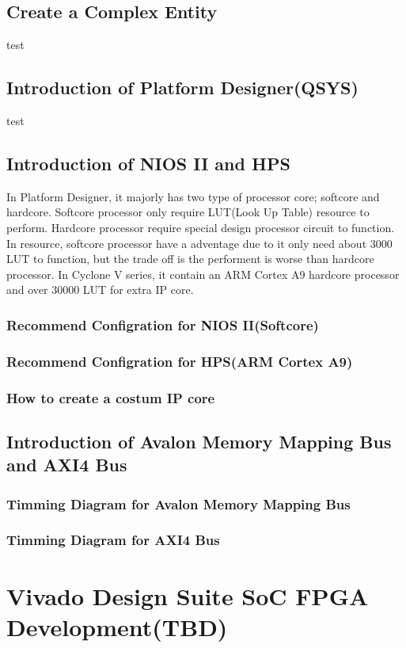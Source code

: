 \documentclass[12pt,article]{memoir}
\begin{document}
\section{Create a Complex Entity}
test
\section{Introduction of Platform Designer(QSYS)}
test
\section{Introduction of NIOS II and HPS}
In Platform Designer, it majorly has two type of processor core; softcore and hardcore. Softcore processor only require LUT(Look Up Table) resource to perform. Hardcore processor require special design processor circuit to function. In resource, softcore processor have a adventage due to it only need about 3000 LUT to function, but the trade off is the performent is worse than hardcore processor. In Cyclone V series, it contain an ARM Cortex A9 hardcore processor and over 30000 LUT for extra IP core.
\subsection{Recommend Configration for NIOS II(Softcore)}
\subsection{Recommend Configration for HPS(ARM Cortex A9)}
\subsection{How to create a costum IP core}
\section{Introduction of Avalon Memory Mapping Bus and AXI4 Bus}
\subsection{Timming Diagram for Avalon Memory Mapping Bus}
\subsection{Timming Diagram for AXI4 Bus}
\chapter{Vivado Design Suite SoC FPGA Development(TBD)}
\end{document}
